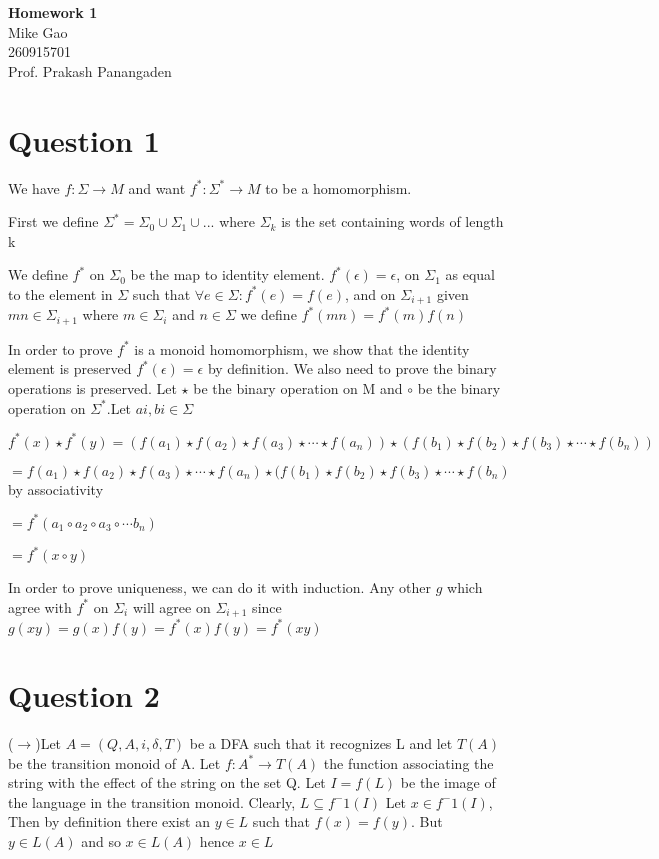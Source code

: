 \documentclass[a4paper, 11pt]{article}
\begin{document}
\noindent
\large\textbf{Homework 1} \hfill \\
\large{Mike Gao} \\
\normalsize 260915701 \\
Prof. Prakash Panangaden \hfill 


\section*{Question 1}
We have $f:\Sigma \rightarrow M$ and want $f^*:\Sigma^* \rightarrow M$ to be a homomorphism.

First we define $\Sigma^* = \Sigma_0 \cup \Sigma_1 \cup ...$ where $\Sigma_k $ is the set containing words of length k

We define $f^*$ on $\Sigma_0$ be the map to identity element. $f^*(\epsilon)= \epsilon$, on $\Sigma_1$ as equal to the element in $\Sigma$ such that $\forall e \in \Sigma: f^*(e) = f(e)$, and on $\Sigma_{i+1}$ given $mn\in\Sigma_{i+1}$ where $m\in\Sigma_i$ and $n\in\Sigma$ we define $f^*(mn)=f^*(m)f(n)$

In order to prove $f^*$ is a monoid homomorphism, we show that the identity element is preserved $f^*(\epsilon) = \epsilon$ by definition.
We also need to prove the binary operations is preserved. Let $\star$ be the binary operation on M and $\circ$ be the binary operation on $\Sigma^*$.Let $ai, bi \in \Sigma$

$f^*(x)\star f^*(y) = (f(a_1)\star f(a_2) \star f(a_3) \star \cdots \star f(a_n))\star (f(b_1)\star f(b_2) \star f(b_3) \star \cdots \star f(b_n))$ 

$= f(a_1)\star f(a_2) \star f(a_3) \star \cdots \star f(a_n) \star (f(b_1)\star f(b_2) \star f(b_3) \star \cdots \star f(b_n)$ by associativity

$=f^*(a_1\circ a_2 \circ a_3 \circ \cdots b_n)$

$=f^*(x\circ y)$

In order to prove uniqueness, we can do it with induction. Any other $g$ which agree with $f^*$ on $\Sigma_i$ will agree on $\Sigma_{i+1}$ since $g(xy)=g(x)f(y)=f^*(x)f(y)=f^*(xy)$



\section*{Question 2}
($\rightarrow$)Let $A=(Q, A, i, \delta, T)$ be a DFA such that it recognizes L and let $T(A)$ be the transition monoid of A. Let $f: A^* \rightarrow T(A)$ the function associating the string with the effect of the string on the set Q. Let $I=f(L)$ be the image of the language in the transition monoid. Clearly, $L \subseteq f^-1(I)$ Let $x \in f^-1(I)$, Then by definition there exist an $y \in L$ such that $f(x) = f(y)$. But $y \in L(A)$ and so $x \in L(A)$ hence $x \in L$
\end{document}
